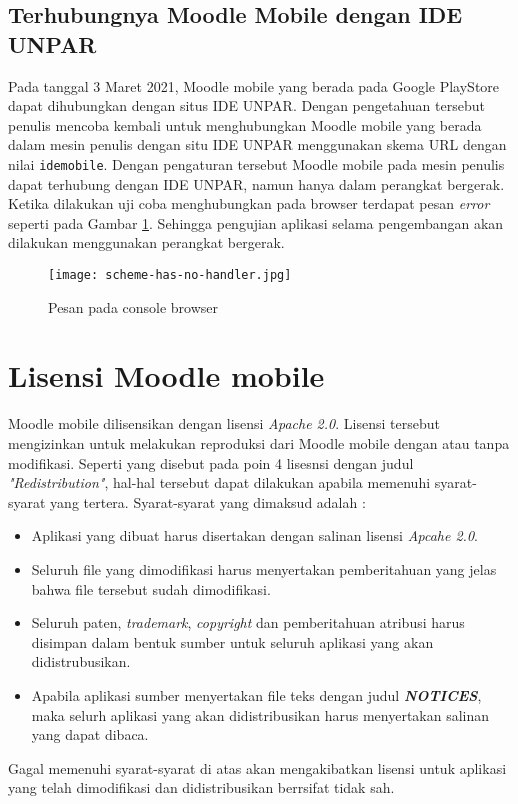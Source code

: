 \subsection{Terhubungnya Moodle Mobile dengan IDE UNPAR}

Pada tanggal 3 Maret 2021, Moodle mobile yang berada pada Google PlayStore dapat dihubungkan dengan situs IDE UNPAR. Dengan pengetahuan tersebut penulis mencoba kembali untuk menghubungkan Moodle mobile yang berada dalam mesin penulis dengan situ IDE UNPAR menggunakan skema URL dengan nilai \texttt{idemobile}. Dengan pengaturan tersebut Moodle mobile pada mesin penulis dapat terhubung dengan IDE UNPAR, namun hanya dalam perangkat bergerak. Ketika dilakukan uji coba menghubungkan pada browser terdapat pesan \textit{error} seperti pada Gambar \ref{fig:protocolerror}. Sehingga pengujian aplikasi selama pengembangan akan dilakukan menggunakan perangkat bergerak.

\begin{figure}[H] 
	\centering  
	\texttt{[image: scheme-has-no-handler.jpg]}  
	\caption[Pesan pada Console browser] {Pesan pada console browser} 
	\label{fig:protocolerror} 
\end{figure} 



\section{Lisensi Moodle mobile}

Moodle mobile dilisensikan dengan lisensi \textit{Apache 2.0}\cite{Moodlemobile:license}. Lisensi tersebut mengizinkan untuk melakukan reproduksi dari Moodle mobile dengan atau tanpa modifikasi. Seperti yang disebut pada poin 4 lisesnsi dengan judul \textit{"Redistribution"}, hal-hal tersebut dapat dilakukan apabila memenuhi syarat-syarat yang tertera. Syarat-syarat yang dimaksud adalah :
\begin{itemize}
\item Aplikasi yang dibuat harus disertakan dengan salinan lisensi \textit{Apcahe 2.0}.
\item Seluruh file yang dimodifikasi harus menyertakan pemberitahuan yang jelas bahwa file tersebut sudah dimodifikasi.
\item Seluruh paten, \textit{trademark}, \textit{copyright} dan pemberitahuan atribusi harus disimpan dalam bentuk sumber untuk seluruh aplikasi yang akan didistrubusikan.
\item Apabila aplikasi sumber menyertakan file teks dengan judul \textit{\textbf{NOTICES}}, maka selurh aplikasi yang akan didistribusikan harus menyertakan salinan yang dapat dibaca.
\end{itemize}
Gagal memenuhi syarat-syarat di atas akan mengakibatkan lisensi untuk aplikasi yang telah dimodifikasi dan didistribusikan berrsifat tidak sah.

